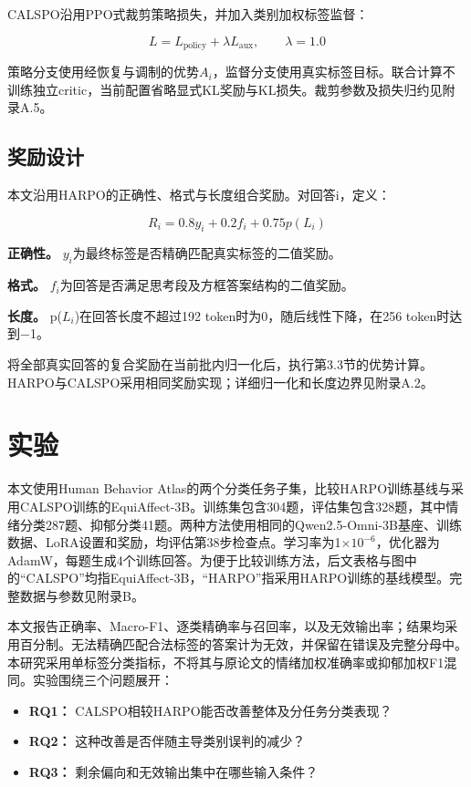 \documentclass[UTF8,a4paper,11pt,fontset=windows]{ctexart}
\begin{document}
CALSPO沿用PPO式裁剪策略损失\cite{ref21}，并加入类别加权标签监督：

\begin{equation}
L=L_{\mathrm{policy}}+\lambda L_{\mathrm{aux}},\qquad\lambda=1.0\label{eq:7}
\end{equation}

策略分支使用经恢复与调制的优势$A_i$，监督分支使用真实标签目标。联合计算不训练独立critic，当前配置省略显式KL奖励与KL损失。裁剪参数及损失归约见附录A.5。

\subsection{奖励设计}

本文沿用HARPO的正确性、格式与长度组合奖励\cite{ref8}。对回答i，定义：

\begin{equation}
R_i=0.8y_i+0.2f_i+0.75p(L_i)\label{eq:8}
\end{equation}

\textbf{正确性。} $y_i$为最终标签是否精确匹配真实标签的二值奖励。

\textbf{格式。} $f_i$为回答是否满足思考段及方框答案结构的二值奖励。

\textbf{长度。} p($L_i$)在回答长度不超过192 token时为0，随后线性下降，在256 token时达到$-$1。

将全部真实回答的复合奖励在当前批内归一化后，执行第3.3节的优势计算。HARPO与CALSPO采用相同奖励实现；详细归一化和长度边界见附录A.2。

\section{实验}

本文使用Human Behavior Atlas\cite{ref3}的两个分类任务子集，比较HARPO训练基线与采用CALSPO训练的EquiAffect-3B。训练集包含304题，评估集包含328题，其中情绪分类287题、抑郁分类41题。两种方法使用相同的Qwen2.5-Omni-3B基座、训练数据、LoRA设置和奖励，均评估第38步检查点。学习率为1$\times$$10^{-6}$，优化器为AdamW\cite{ref22}，每题生成4个训练回答。为便于比较训练方法，后文表格与图中的“CALSPO”均指EquiAffect-3B，“HARPO”指采用HARPO训练的基线模型。完整数据与参数见附录B。

本文报告正确率、Macro-F1、逐类精确率与召回率，以及无效输出率；结果均采用百分制。无法精确匹配合法标签的答案计为无效，并保留在错误及完整分母中。本研究采用单标签分类指标，不将其与原论文的情绪加权准确率或抑郁加权F1混同。实验围绕三个问题展开：

\begin{itemize}
\item \textbf{RQ1：} CALSPO相较HARPO能否改善整体及分任务分类表现？
\item \textbf{RQ2：} 这种改善是否伴随主导类别误判的减少？
\item \textbf{RQ3：} 剩余偏向和无效输出集中在哪些输入条件？
\end{itemize}
\end{document}
